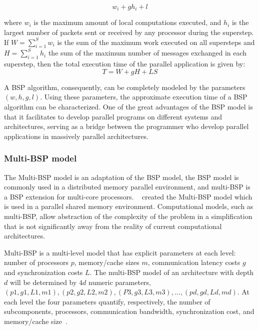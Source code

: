 \begin{equation}
  \label{eq:superstep-cost}
  w_i + g h_i + l
\end{equation}

where $w_i$ is the maximum amount of local computations executed, and $h_i$ is the largest number of packets sent or received by any processor during the superstep. If $W = \sum_{i=1}^{S} w_i$ is the sum of the maximum work executed on all supersteps and $H = \sum_{i=1}^{S} h_i$ the sum of the maximum number of messages exchanged in each superstep, then the total execution time of the parallel application is given by:
\begin{equation}
  \label{ec:BSP}
  T = W + g H + L S
\end{equation}

A BSP algorithm, consequently, can be completely modeled by the parameters $(w, h, g, l)$. Using these parameters, the approximate execution time of a BSP algorithm can be characterized. One of the great advantages of the BSP model is that it facilitates to develop parallel programs on different systems and architectures, serving as a bridge between the programmer who develop parallel applications in massively parallel architectures.

\subsubsection{Multi-BSP model}
The Multi-BSP model is an adaptation of the BSP model, the BSP model is commonly used in a distributed memory parallel environment, and multi-BSP is a BSP extension for multi-core processors. ~\cite{Valiant:2011} created the Multi-BSP model which is used in a parallel shared memory environment. Computational models, such as multi-BSP, allow abstraction of the complexity of the problem in a simplification that is not significantly away from the reality of current computational  architectures.  

Multi-BSP is a multi-level model that has explicit parameters at each level: number of processors $p$, memory/cache sizes $m$, communication latency costs $g$ and synchronization costs $L$. The multi-BSP model of an architecture with depth $d$ will be determined by $4d$ numeric parameters, $(p1, g1, L1, m1), (p2, g2, L2, m2), ( P3, g3, L3, m3), ..., (pd, gd, Ld, md)$. At each level the four parameters quantify, respectively, the number of subcomponents, processors, communication bandwidth, synchronization cost, and memory/cache size~\citep{BSPMeasures}.

